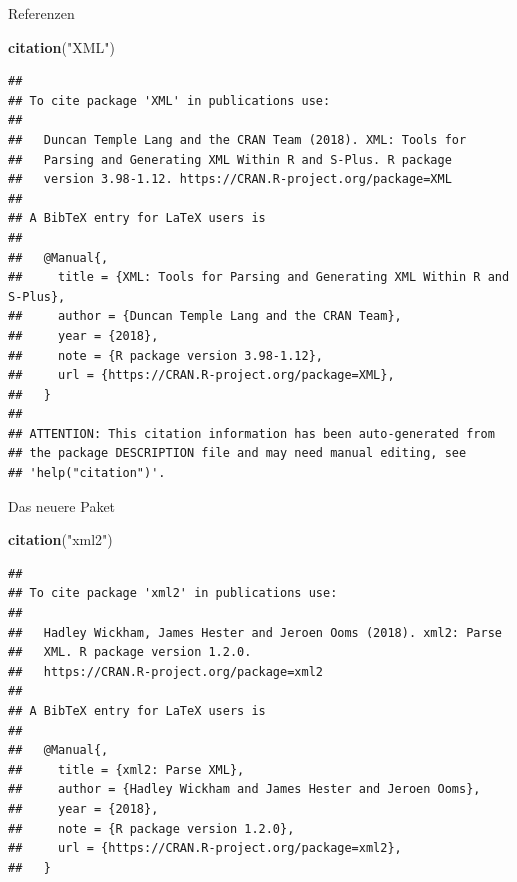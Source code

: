 \documentclass[ignorenonframetext,]{beamer}
\newenvironment{Shaded}{\begin{snugshade}}{\end{snugshade}}
\newcommand{\KeywordTok}[1]{\textcolor[rgb]{0.13,0.29,0.53}{\textbf{#1}}}
\newcommand{\NormalTok}[1]{#1}
\newcommand{\StringTok}[1]{\textcolor[rgb]{0.31,0.60,0.02}{#1}}
\begin{document}
\begin{frame}[fragile]{Referenzen}
\protect\hypertarget{referenzen}{}

\begin{Shaded}
\begin{Highlighting}[]
\KeywordTok{citation}\NormalTok{(}\StringTok{"XML"}\NormalTok{)}
\end{Highlighting}
\end{Shaded}

\begin{verbatim}
## 
## To cite package 'XML' in publications use:
## 
##   Duncan Temple Lang and the CRAN Team (2018). XML: Tools for
##   Parsing and Generating XML Within R and S-Plus. R package
##   version 3.98-1.12. https://CRAN.R-project.org/package=XML
## 
## A BibTeX entry for LaTeX users is
## 
##   @Manual{,
##     title = {XML: Tools for Parsing and Generating XML Within R and S-Plus},
##     author = {Duncan Temple Lang and the CRAN Team},
##     year = {2018},
##     note = {R package version 3.98-1.12},
##     url = {https://CRAN.R-project.org/package=XML},
##   }
## 
## ATTENTION: This citation information has been auto-generated from
## the package DESCRIPTION file and may need manual editing, see
## 'help("citation")'.
\end{verbatim}

\end{frame}

\begin{frame}[fragile]{Das neuere Paket}
\protect\hypertarget{das-neuere-paket}{}

\begin{Shaded}
\begin{Highlighting}[]
\KeywordTok{citation}\NormalTok{(}\StringTok{"xml2"}\NormalTok{)}
\end{Highlighting}
\end{Shaded}

\begin{verbatim}
## 
## To cite package 'xml2' in publications use:
## 
##   Hadley Wickham, James Hester and Jeroen Ooms (2018). xml2: Parse
##   XML. R package version 1.2.0.
##   https://CRAN.R-project.org/package=xml2
## 
## A BibTeX entry for LaTeX users is
## 
##   @Manual{,
##     title = {xml2: Parse XML},
##     author = {Hadley Wickham and James Hester and Jeroen Ooms},
##     year = {2018},
##     note = {R package version 1.2.0},
##     url = {https://CRAN.R-project.org/package=xml2},
##   }
\end{verbatim}

\end{frame}
\end{document}
